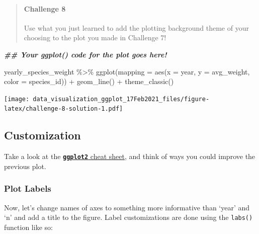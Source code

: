 \documentclass[
]{article}
\newenvironment{Shaded}{\begin{snugshade}}{\end{snugshade}}
\newcommand{\AttributeTok}[1]{\textcolor[rgb]{0.77,0.63,0.00}{#1}}
\newcommand{\DocumentationTok}[1]{\textcolor[rgb]{0.56,0.35,0.01}{\textbf{\textit{#1}}}}
\newcommand{\FunctionTok}[1]{\textcolor[rgb]{0.00,0.00,0.00}{#1}}
\newcommand{\NormalTok}[1]{#1}
\newcommand{\SpecialCharTok}[1]{\textcolor[rgb]{0.00,0.00,0.00}{#1}}
\begin{document}
\begin{quote}
\mbox{}%
\hypertarget{challenge-8}{%
\paragraph{Challenge 8}\label{challenge-8}}

Use what you just learned to add the plotting background theme of your
choosing to the plot you made in Challenge 7!
\end{quote}

\begin{Shaded}
\begin{Highlighting}[]
\DocumentationTok{\#\# Your ggplot() code for the plot goes here!}
\end{Highlighting}
\end{Shaded}

\begin{Shaded}
\begin{Highlighting}[]
\NormalTok{yearly\_species\_weight }\SpecialCharTok{\%\textgreater{}\%} 
  \FunctionTok{ggplot}\NormalTok{(}\AttributeTok{mapping =} \FunctionTok{aes}\NormalTok{(}\AttributeTok{x =}\NormalTok{ year, }\AttributeTok{y =}\NormalTok{ avg\_weight, }\AttributeTok{color =}\NormalTok{ species\_id)) }\SpecialCharTok{+}
  \FunctionTok{geom\_line}\NormalTok{() }\SpecialCharTok{+} 
  \FunctionTok{theme\_classic}\NormalTok{()}
\end{Highlighting}
\end{Shaded}

\texttt{[image: data\_visualization\_ggplot\_17Feb2021\_files/figure-latex/challenge-8-solution-1.pdf]}

\hypertarget{customization}{%
\subsection{Customization}\label{customization}}

Take a look at the
\href{https://github.com/rstudio/cheatsheets/raw/master/data-visualization-2.1.pdf}{\textbf{\texttt{ggplot2}}
cheat sheet}, and think of ways you could improve the previous plot.

\hypertarget{plot-labels}{%
\subsubsection{Plot Labels}\label{plot-labels}}

Now, let's change names of axes to something more informative than
`year' and `n' and add a title to the figure. Label customizations are
done using the \texttt{labs()} function like so:
\end{document}
